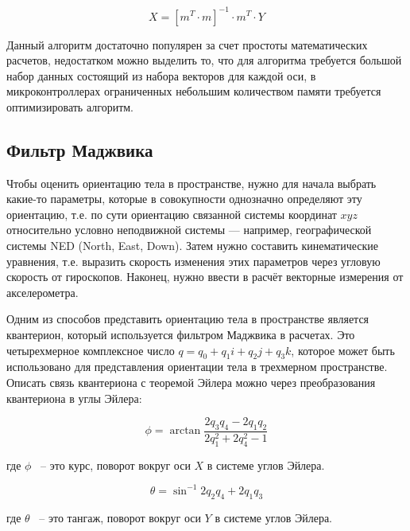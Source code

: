 \begin{equation}
    \label{eq:domain:XL_CALIB}
    X = \left[m^T \cdot m\right]^{-1}\cdot m^T \cdot Y
  \end{equation}

Данный алгоритм достаточно популярен за счет простоты математических расчетов, недостатком можно выделить то, что 
для алгоритма требуется большой набор данных состоящий из набора векторов для каждой оси, в микроконтроллерах ограниченных небольшим 
количеством памяти требуется оптимизировать алгоритм. 

\subsection{Фильтр Маджвика}

Чтобы оценить ориентацию тела в пространстве, нужно для начала выбрать какие-то параметры, 
которые в совокупности однозначно определяют эту ориентацию, т.е. по сути ориентацию связанной 
системы координат $xyz$ относительно условно неподвижной системы — например, географической системы NED (North, East, Down). 
Затем нужно составить кинематические уравнения, т.е. выразить скорость изменения этих параметров через угловую скорость от 
гироскопов. Наконец, нужно ввести в расчёт векторные измерения от акселерометра.

Одним из способов представить ориентацию тела в пространстве является квантерион, который используется фильтром Маджвика в расчетах.
Это четырехмерное комплексное число $q=q_{0}+q_{1}i+q_{2}j+q_{3}k$, которое может быть использовано 
для представления ориентации тела в трехмерном пространстве.
Описать связь квантериона с теоремой Эйлера можно через преобразования квантериона в углы Эйлера: 

\begin{equation}
    \label{eq:domain:QtoPhi}
    \phi = \arctan{\frac{2q_{3}q_{4}-2q_{1}q_{2}}{2q_{1}^{2} + 2q_{4}^{2}-1}}
    \end{equation}
\begin{explanationx}
    \item[где] $\phi$ ~-- это курс, поворот вокруг оси $X$ в системе углов Эйлера.
    \end{explanationx} 

    \begin{equation}
        \label{eq:domain:QtoTheta}
        \theta = \sin^{-1}{2q_{2}q_{4}+2q_{1}q_{3}}
    \end{equation}
    \begin{explanationx}
        \item[где] $\theta$ ~-- это тангаж, поворот вокруг оси $Y$ в системе углов Эйлера.
    \end{explanationx} 

